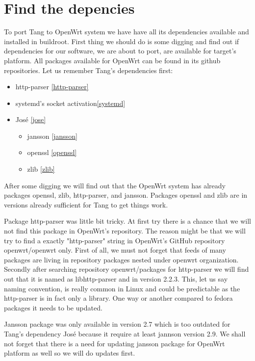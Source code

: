 \section{Find the depencies}

To port Tang to OpenWrt system we have have all its dependencies available and installed in buildroot.
First thing we should do is some digging and find out if dependencies for our software, we are about to port, are available for target's platform.
All packages available for OpenWrt can be found in its github repositories.
Let us remember Tang's dependencies first:

\begin{itemize}
\item http-parser \ref{http-parser}
\item systemd's socket activation\ref{systemd}
\item José \ref{jose}
    \begin{itemize}
    \item jansson \ref{jansson}
    \item openssl \ref{openssl}
    \item zlib \ref{zlib}
    \end{itemize}
\end{itemize}

After some digging we will find out that the OpenWrt system has already packages openssl, zlib, http-parser, and jansson.
Packages openssl and zlib are in versions already sufficient for Tang to get things work.

Package http-parser was little bit tricky.
At first try there is a chance that we will not find this package in OpenWrt's repository.
The reason might be that we will try to find a exactly "http-parser" string in OpenWrt's GitHub repository openwrt/openwrt only.
First of all, we must not forget that feeds of many packages are living in repository packages nested under openwrt organization.
Secondly after searching repository openwrt/packages for http-parser we will find out that it is named as libhttp-parser and in version 2.2.3.
This, let us say naming convention, is really common in Linux and could be predictable as the http-parser is in fact only a library.
One way or another compared to fedora packages it needs to be updated.

Jansson package was only available in version 2.7 which is too outdated for Tang's dependency José because it require at least jannson version 2.9.
We shall not forget that there is a need for updating jansson package for OpenWrt platform as well so we will do updates first.

